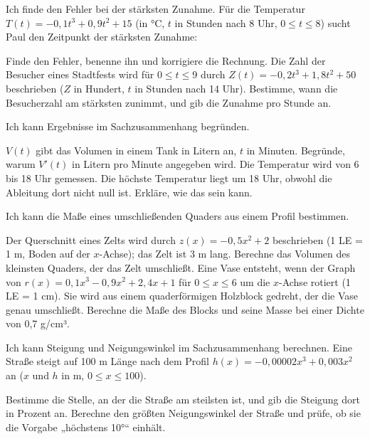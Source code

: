 \begin{aufgabe}{Ich finde den Fehler bei der stärksten Zunahme. Für die Temperatur $T(t) = -0{,}1t^3 + 0{,}9t^2 + 15$ (in °C, $t$ in Stunden nach 8 Uhr, $0 \le t \le 8$) sucht Paul den Zeitpunkt der stärksten Zunahme:}
\begin{teile}
\teil Finde den Fehler, benenne ihn und korrigiere die Rechnung.
\teil Die Zahl der Besucher eines Stadtfests wird für $0 \le t \le 9$ durch $Z(t) = -0{,}2t^3 + 1{,}8t^2 + 50$ beschrieben ($Z$ in Hundert, $t$ in Stunden nach 14 Uhr). Bestimme, wann die Besucherzahl am stärksten zunimmt, und gib die Zunahme pro Stunde an.
\end{teile}
\end{aufgabe}

\begin{aufgabe}{Ich kann Ergebnisse im Sachzusammenhang begründen.}
\begin{teile}
\teil $V(t)$ gibt das Volumen in einem Tank in Litern an, $t$ in Minuten. Begründe, warum $V'(t)$ in Litern pro Minute angegeben wird.
\teil Die Temperatur wird von 6 bis 18 Uhr gemessen. Die höchste Temperatur liegt um 18 Uhr, obwohl die Ableitung dort nicht null ist. Erkläre, wie das sein kann.
\end{teile}
\end{aufgabe}

\begin{aufgabe}{Ich kann die Maße eines umschließenden Quaders aus einem Profil bestimmen.}
\begin{teile}
\teil Der Querschnitt eines Zelts wird durch $z(x) = -0{,}5x^2 + 2$ beschrieben (1 LE = 1 m, Boden auf der $x$-Achse); das Zelt ist 3 m lang. Berechne das Volumen des kleinsten Quaders, der das Zelt umschließt.
\teil Eine Vase entsteht, wenn der Graph von $r(x) = 0{,}1x^3 - 0{,}9x^2 + 2{,}4x + 1$ für $0 \le x \le 6$ um die $x$-Achse rotiert (1 LE = 1 cm). Sie wird aus einem quaderförmigen Holzblock gedreht, der die Vase genau umschließt. Berechne die Maße des Blocks und seine Masse bei einer Dichte von 0,7 g/cm³.
\end{teile}
\end{aufgabe}

\begin{aufgabe}{Ich kann Steigung und Neigungswinkel im Sachzusammenhang berechnen. Eine Straße steigt auf 100 m Länge nach dem Profil $h(x) = -0{,}00002x^3 + 0{,}003x^2$ an ($x$ und $h$ in m, $0 \le x \le 100$).}
\begin{teile}
\teil Bestimme die Stelle, an der die Straße am steilsten ist, und gib die Steigung dort in Prozent an.
\teil Berechne den größten Neigungswinkel der Straße und prüfe, ob sie die Vorgabe „höchstens 10°“ einhält.
\end{teile}
\end{aufgabe}

